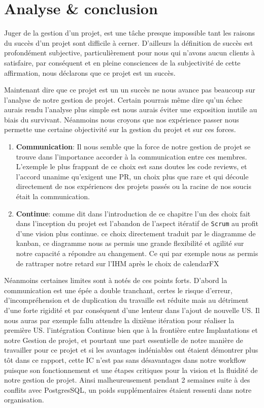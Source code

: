 \documentclass[a4paper,french,final]{memoir}
\begin{document}
\section{Analyse \& conclusion}

Juger de la gestion d'un projet, est une tâche presque impossible tant les raisons du succès d'un projet
sont difficile à cerner. D'ailleurs la définition de succès est profondément subjective, particulièrement
pour nous qui n'avons aucun clients à satisfaire, par conséquent et en pleine consciences de la subjectivité
de cette affirmation, nous déclarons que ce projet est un succès.


Maintenant dire que ce projet est un un succès ne nous avance pas beaucoup sur l'analyse de notre gestion de
projet. Certain pourrais même dire qu'un échec aurais rendu l'analyse plus simple est nous aurais éviter une
exposition inutile au biais du survivant. Néanmoins nous croyons que nos expérience passer nous permette une
certaine objectivité sur la gestion du projet et sur ces forces.
\begin{enumerate}
	\item  \textbf{Communication}: Il nous semble que la force de notre gestion de projet se trouve dans
	l'importance accorder à la communication entre ces membres.
	L'exemple le plus frappant de ce choix est sans doutes les code reviews, et l'accord unanime qu'exigent
	une PR, un choix plus que rare et qui découle directement de nos expériences des projets passés ou
	la racine de nos soucis était la communication.

	\item \textbf{Continue}: comme dit dans l'introduction de ce chapitre l'un des choix fait dans l'inception du projet est l'abandon de l'aspect itératif de \texttt{Scrum} au profit d'une vision plus continue. ce choix directement traduit	par le diagramme de kanban, ce diagramme nous as permis une grande flexibilité et agilité sur notre capacité a répondre au changement. Ce qui par exemple nous as permis de rattraper notre retard sur l'IHM après le choix de calendarFX
\end{enumerate}

Néanmoins certaines limites sont à notés de ces points forts. D'abord la communication est une épée a double tranchant, certes le risque d'erreur, d'incompréhension et de duplication du
travaille est réduite mais au détriment d'une forte rigidité et par conséquent d'une lenteur dans l'ajout de nouvelle US. Il nous auras par exemple fallu attendre la dixième itération pour
réaliser la première US. l'intégration Continue bien que à la frontière entre Implantations et notre Gestion de projet, et pourtant une part essentielle de notre manière de
travailler pour ce projet et si les avantages indéniables ont étaient démontrer plus tôt dans ce rapport, cette IC n'est pas sans désavantages dans notre workflow puisque son fonctionnement et
une étapes critiques pour la vision et la fluidité de notre gestion de projet. Ainsi malheureusement pendant 2 semaines suite à des conflits avec PostgresSQL, un poids supplémentaires étaient ressenti dans notre
organisation.
\end{document}
